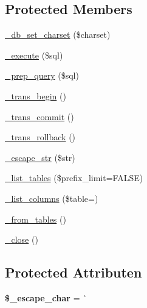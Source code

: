 \subsection*{Protected Members}
\begin{DoxyCompactItemize}
\item 
\mbox{\hyperlink{class_c_i___d_b__mysql__driver_a2b808d420d8e9fea0b73ad7127f5efb8}{\+\_\+db\+\_\+set\+\_\+charset}} (\$charset)
\item 
\mbox{\hyperlink{class_c_i___d_b__mysql__driver_a114ab675d89bf8324a41785fb475e86d}{\+\_\+execute}} (\$sql)
\item 
\mbox{\hyperlink{class_c_i___d_b__mysql__driver_a86af88ef0fa6d44ab4691e3f53270339}{\+\_\+prep\+\_\+query}} (\$sql)
\item 
\mbox{\hyperlink{class_c_i___d_b__mysql__driver_ac81ac882c1d54347d810199a15856aac}{\+\_\+trans\+\_\+begin}} ()
\item 
\mbox{\hyperlink{class_c_i___d_b__mysql__driver_a6fe7f373e0b11cfae23a5f41c0b35dda}{\+\_\+trans\+\_\+commit}} ()
\item 
\mbox{\hyperlink{class_c_i___d_b__mysql__driver_ad49a116b0776c26b53114c9093fd102a}{\+\_\+trans\+\_\+rollback}} ()
\item 
\mbox{\hyperlink{class_c_i___d_b__mysql__driver_af8ef0237bfcdb19215b63fff769e7a55}{\+\_\+escape\+\_\+str}} (\$str)
\item 
\mbox{\hyperlink{class_c_i___d_b__mysql__driver_a435c0f3ce54fe7daa178baa8532ebd54}{\+\_\+list\+\_\+tables}} (\$prefix\+\_\+limit=F\+A\+L\+SE)
\item 
\mbox{\hyperlink{class_c_i___d_b__mysql__driver_a7ccb7f9c301fe7f0a9db701254142b63}{\+\_\+list\+\_\+columns}} (\$table=\textquotesingle{}\textquotesingle{})
\item 
\mbox{\hyperlink{class_c_i___d_b__mysql__driver_aef43f7e3e7b71d337ff3724c5eb14f10}{\+\_\+from\+\_\+tables}} ()
\item 
\mbox{\hyperlink{class_c_i___d_b__mysql__driver_a4d9082658000e5ede8312067c6dda9db}{\+\_\+close}} ()
\end{DoxyCompactItemize}
\subsection*{Protected Attributen}
\begin{DoxyCompactItemize}
\item 
\mbox{\label{class_c_i___d_b__mysql__driver_aaec2fb0112850159063a8e47ad3aed6e}} 
{\bfseries \$\+\_\+escape\+\_\+char} = \textquotesingle{}\`{}\textquotesingle{}
\end{DoxyCompactItemize}


